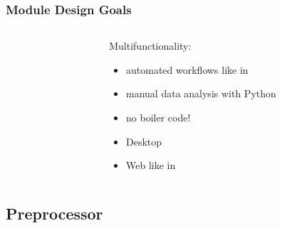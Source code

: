 \documentclass{beamer}
\begin{document}
\begin{frame}\frametitle{Module Design Goals}
    \begin{columns}
        \begin{column}{.4\textwidth}
            \centerline{\theimage}
        \end{column}
        \begin{column}{.6\textwidth}
            Multifunctionality:
            \begin{itemize}            
            \item automated workflows like in \aiida{}
            \item manual data analysis with Python
            \end{itemize}
            \hdashrule{\textwidth}{1pt}{1pt}
            \begin{itemize}
            \item no boiler code!
            \end{itemize}
            \hdashrule{\textwidth}{1pt}{1pt}
            \begin{itemize}
            \item Desktop \faDesktop{}
            \item Web \faServer{} \faArrowRight{} \faGlobe{} like in \aiidalab{}
            \end{itemize}
        \end{column}
    \end{columns}


    
    
    
\end{frame}

\subsection{Preprocessor}
\label{sec:preprocessor}
\end{document}
